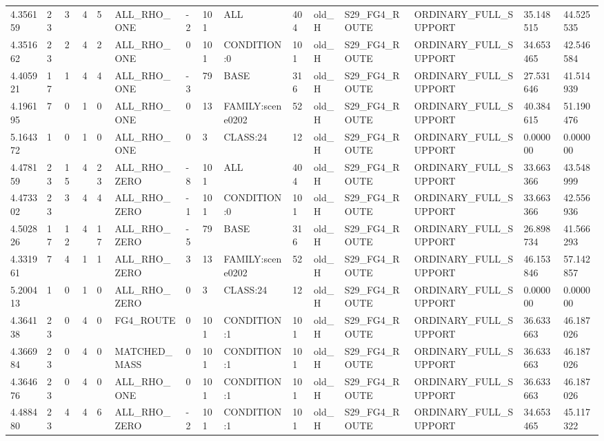 \begin{tabular}{lllllllllllllll}
4.356159 & 23 & 3 & 4 & 5 & ALL\_RHO\_ONE & -2 & 101 & ALL & 404 & old\_H & S29\_FG4\_ROUTE & ORDINARY\_FULL\_SUPPORT & 35.148515 & 44.525535 \\
4.351662 & 23 & 2 & 4 & 2 & ALL\_RHO\_ONE & 0 & 101 & CONDITION:0 & 101 & old\_H & S29\_FG4\_ROUTE & ORDINARY\_FULL\_SUPPORT & 34.653465 & 42.546584 \\
4.405921 & 17 & 1 & 4 & 4 & ALL\_RHO\_ONE & -3 & 79 & BASE & 316 & old\_H & S29\_FG4\_ROUTE & ORDINARY\_FULL\_SUPPORT & 27.531646 & 41.514939 \\
4.196195 & 7 & 0 & 1 & 0 & ALL\_RHO\_ONE & 0 & 13 & FAMILY:scene0202 & 52 & old\_H & S29\_FG4\_ROUTE & ORDINARY\_FULL\_SUPPORT & 40.384615 & 51.190476 \\
5.164372 & 1 & 0 & 1 & 0 & ALL\_RHO\_ONE & 0 & 3 & CLASS:24 & 12 & old\_H & S29\_FG4\_ROUTE & ORDINARY\_FULL\_SUPPORT & 0.000000 & 0.000000 \\
4.478159 & 23 & 15 & 4 & 23 & ALL\_RHO\_ZERO & -8 & 101 & ALL & 404 & old\_H & S29\_FG4\_ROUTE & ORDINARY\_FULL\_SUPPORT & 33.663366 & 43.548999 \\
4.473302 & 23 & 3 & 4 & 4 & ALL\_RHO\_ZERO & -1 & 101 & CONDITION:0 & 101 & old\_H & S29\_FG4\_ROUTE & ORDINARY\_FULL\_SUPPORT & 33.663366 & 42.556936 \\
4.502826 & 17 & 12 & 4 & 17 & ALL\_RHO\_ZERO & -5 & 79 & BASE & 316 & old\_H & S29\_FG4\_ROUTE & ORDINARY\_FULL\_SUPPORT & 26.898734 & 41.566293 \\
4.331961 & 7 & 4 & 1 & 1 & ALL\_RHO\_ZERO & 3 & 13 & FAMILY:scene0202 & 52 & old\_H & S29\_FG4\_ROUTE & ORDINARY\_FULL\_SUPPORT & 46.153846 & 57.142857 \\
5.200413 & 1 & 0 & 1 & 0 & ALL\_RHO\_ZERO & 0 & 3 & CLASS:24 & 12 & old\_H & S29\_FG4\_ROUTE & ORDINARY\_FULL\_SUPPORT & 0.000000 & 0.000000 \\
4.364138 & 23 & 0 & 4 & 0 & FG4\_ROUTE & 0 & 101 & CONDITION:1 & 101 & old\_H & S29\_FG4\_ROUTE & ORDINARY\_FULL\_SUPPORT & 36.633663 & 46.187026 \\
4.366984 & 23 & 0 & 4 & 0 & MATCHED\_MASS & 0 & 101 & CONDITION:1 & 101 & old\_H & S29\_FG4\_ROUTE & ORDINARY\_FULL\_SUPPORT & 36.633663 & 46.187026 \\
4.364676 & 23 & 0 & 4 & 0 & ALL\_RHO\_ONE & 0 & 101 & CONDITION:1 & 101 & old\_H & S29\_FG4\_ROUTE & ORDINARY\_FULL\_SUPPORT & 36.633663 & 46.187026 \\
4.488480 & 23 & 4 & 4 & 6 & ALL\_RHO\_ZERO & -2 & 101 & CONDITION:1 & 101 & old\_H & S29\_FG4\_ROUTE & ORDINARY\_FULL\_SUPPORT & 34.653465 & 45.117322 \\

\end{tabular}
